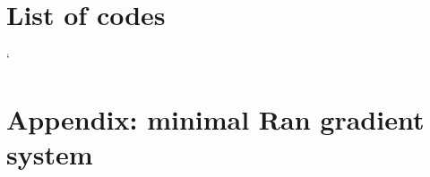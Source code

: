 \documentclass[12pt,notitlepage]{article}
\begin{document}
%




\clearpage

\renewcommand*{\bibfont}{\normalfont\small}
\printbibliography %


\section*{List of codes}

\begin{center}
\SHOWCODES
\end{center}



`\clearpage

\section{Appendix: minimal Ran gradient system} \label{s:app:gsr-ran}






%
\end{document}
